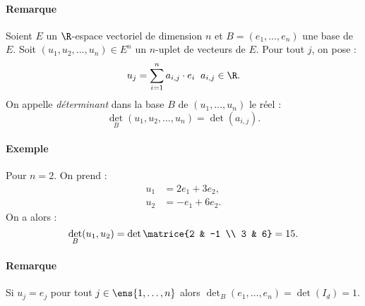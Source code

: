 \paragraph{Remarque}Soient $E$ un $\R$-espace vectoriel de dimension $n$ et $B = (e_1,\ldots,e_n)$  une base de $E$. Soit $(u_1,u_2,\ldots,u_n) \in E^{n}$ un $n$-uplet  de vecteurs de $E$. Pour tout $j$, on pose : \[ u_j = \sum_{i=1}^{n}a_{i,j}\cdot e_{i}  \; \; a_{i,j}\in \R.\]On appelle \textit{déterminant} dans la base $B$ de $(u_1,\ldots,u_n)$ le réel : \[ \det_B(u_1,u_2,\ldots,u_n) = \det(a_{i,j}).\]

\paragraph{Exemple}Pour $n=2$. On prend :
\begin{align*}
u_1 &= 2e_1 + 3e_2, \\
u_2 &= -e_1 + 6e_2.
\end{align*}
On a alors : \[ \det_B(u_1,u_2) = \det \matrice{2 & -1 \\ 3 & 6} = 15.\]

\paragraph{Remarque}Si $u_j = e_j$ pour tout $j \in \ens{1,\ldots,n}$ alors $\det_B(e_1,\ldots,e_n) = \det(I_d) = 1$. 

